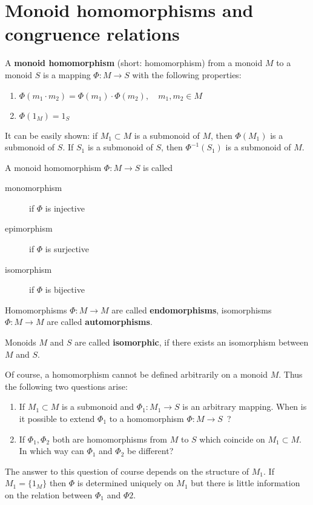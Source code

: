\section{Monoid homomorphisms and congruence relations}

\begin{definition}
A {\bf monoid homomorphism} (short: homomorphism) from a monoid $M$ to a monoid
$S$ is a mapping $\Phi : M \to S$ with the following properties:
\begin{enumerate}
  \item $\Phi(m_1 \cdot m_2) = \Phi(m_1) \cdot \Phi(m_2), \quad m_1, m_2 \in M$
  \item $\Phi(1_M) = 1_S$
\end{enumerate}
\end{definition}

It can be easily shown: if $M_1 \subset M$ is a submonoid of $M$, then
$\Phi(M_1)$ is a submonoid of $S$. If $S_1$ is a submonoid of $S$, then
$\Phi^{-1}(S_1)$ is a submonoid of $M$.

A monoid homomorphism $\Phi : M \to S$ is called
\begin{description}
  \item[monomorphism] if $\Phi$ is injective
  \item[epimorphism] if $\Phi$ is surjective
  \item[isomorphism] if $\Phi$ is bijective
\end{description}

Homomorphisms $\Phi : M \to M$ are called {\bf endomorphisms}, isomorphisms
$\Phi : M \to M$ are called {\bf automorphisms}.

Monoids $M$ and $S$ are called {\bf isomorphic}, if there exists an
isomorphism between $M$ and $S$.

Of course, a homomorphism cannot be defined arbitrarily on a monoid $M$.
Thus the following two questions arise:
\begin{enumerate}
  \item If $M_1 \subset M$ is a submonoid and $\Phi_1 : M_1 \to S$ is an arbitrary
mapping. When is it possible to extend $\Phi_1$ to a homomorphism $\Phi
: M \to S$\ ?
	\item If $\Phi_1, \Phi_2$ both are homomorphisms from $M$ to $S$ which
	coincide on $M_1 \subset M$. In which way can $\Phi_1$ and $\Phi_2$ be
	different? 
\end{enumerate}

The answer to this question of course depends on the structure of $M_1$. If
$M_1 = \{ 1_M \}$ then $\Phi$ is determined uniquely on $M_1$ but there is
little information on the relation between $\Phi_1$ and $\Phi2$.

